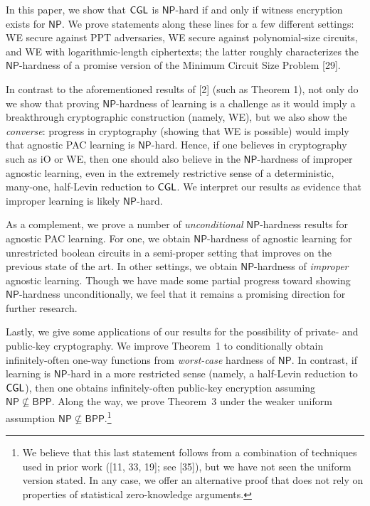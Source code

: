 


In this paper, we show that ${\sf CGL}$ is ${\mathsf{NP}}$-hard if and only if witness encryption exists for ${\mathsf{NP}}$. We prove statements along these lines for a few different settings: WE secure against PPT adversaries, WE secure against polynomial-size circuits, and WE with logarithmic-length ciphertexts; the latter roughly characterizes the ${\mathsf{NP}}$-hardness of a promise version of the Minimum Circuit Size Problem [29].\par




In contrast to the aforementioned results of [2] (such as Theorem 1), not only do we show that proving ${\mathsf{NP}}$-hardness of learning is a challenge as it would imply a breakthrough cryptographic construction (namely, WE), but we also show the \emph{converse}: progress in cryptography (showing that WE is possible) would imply that agnostic PAC learning is ${\mathsf{NP}}$-hard. Hence, if one believes in cryptography such as iO or WE, then one should also believe in the ${\mathsf{NP}}$-hardness of improper agnostic learning, even in the extremely restrictive sense of a deterministic, many-one, half-Levin reduction to ${\sf CGL}$. We interpret our results as evidence that improper learning is likely ${\mathsf{NP}}$-hard.\par




As a complement, we prove a number of \emph{unconditional} ${\mathsf{NP}}$-hardness results for agnostic PAC learning. For one, we obtain ${\mathsf{NP}}$-hardness of agnostic learning for unrestricted boolean circuits in a semi-proper setting that improves on the previous state of the art. In other settings, we obtain ${\mathsf{NP}}$-hardness of \emph{improper} agnostic learning. Though we have made some partial progress toward showing ${\mathsf{NP}}$-hardness unconditionally, we feel that it remains a promising direction for further research.\par




Lastly, we give some applications of our results for the possibility of private- and public-key cryptography. We improve Theorem 1 to conditionally obtain infinitely-often one-way functions from \emph{worst-case} hardness of ${\mathsf{NP}}$. In contrast, if learning is ${\mathsf{NP}}$-hard in a more restricted sense (namely, a half-Levin reduction to ${\sf CGL}$), then one obtains infinitely-often public-key encryption assuming ${\mathsf{NP}}\nsubseteq{\mathsf{BPP}}$. Along the way, we prove Theorem 3 under the weaker uniform assumption ${\mathsf{NP}}\nsubseteq{\mathsf{BPP}}$.\footnote{We believe that this last statement follows from a combination of techniques used in prior work ([11, 33, 19]; see [35]), but we have not seen the uniform version stated. In any case, we offer an alternative proof that does not rely on properties of statistical zero-knowledge arguments.}\par





